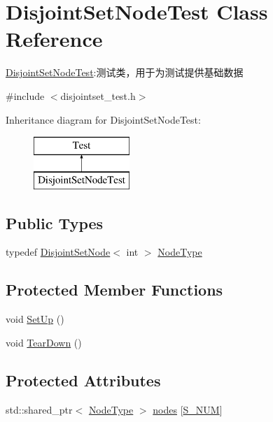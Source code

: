 \hypertarget{class_disjoint_set_node_test}{}\section{Disjoint\+Set\+Node\+Test Class Reference}
\label{class_disjoint_set_node_test}


\hyperlink{class_disjoint_set_node_test}{Disjoint\+Set\+Node\+Test}\+:测试类，用于为测试提供基础数据  




{\ttfamily \#include $<$disjointset\+\_\+test.\+h$>$}

Inheritance diagram for Disjoint\+Set\+Node\+Test\+:\begin{figure}[H]
\begin{center}
\leavevmode
\includegraphics[height=2.000000cm]{class_disjoint_set_node_test}
\end{center}
\end{figure}
\subsection*{Public Types}
\begin{DoxyCompactItemize}
\item 
typedef \hyperlink{struct_introduction_to_algorithm_1_1_set_algorithm_1_1_disjoint_set_node}{Disjoint\+Set\+Node}$<$ int $>$ \hyperlink{class_disjoint_set_node_test_a2f0849289c8020ac6e4ef918b7f2cbde}{Node\+Type}
\end{DoxyCompactItemize}
\subsection*{Protected Member Functions}
\begin{DoxyCompactItemize}
\item 
void \hyperlink{class_disjoint_set_node_test_a6deb2278f038f2fb93f33c9415d757e9}{Set\+Up} ()
\item 
void \hyperlink{class_disjoint_set_node_test_ab6fd5a639f421653273b483a30a3e264}{Tear\+Down} ()
\end{DoxyCompactItemize}
\subsection*{Protected Attributes}
\begin{DoxyCompactItemize}
\item 
std\+::shared\+\_\+ptr$<$ \hyperlink{class_disjoint_set_node_test_a2f0849289c8020ac6e4ef918b7f2cbde}{Node\+Type} $>$ \hyperlink{class_disjoint_set_node_test_ae4bf8c2dd6ec1c63cdef65562fb5a278}{nodes} \mbox{[}\hyperlink{disjointset__test_8h_a7dbebe726f3bea0def8f1e9309d2f205}{S\+\_\+\+N\+U\+M}\mbox{]}
\end{DoxyCompactItemize}


